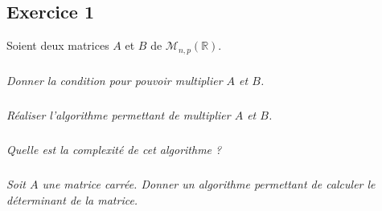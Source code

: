 \documentclass[10pt]{article}
\begin{document}

\subsection*{Exercice 1}

Soient deux matrices $A$ et $B$ de $\mathcal{M}_{n,p}(\mathbb{R})$. 

\subparagraph{}
\textit{Donner la condition pour pouvoir multiplier $A$ et $B$.}

\subparagraph{}
\textit{Réaliser l'algorithme permettant de multiplier $A$ et $B$.}

\subparagraph{}
\textit{Quelle est la complexité de cet algorithme ?}

\subparagraph{}
\textit{Soit $A$ une matrice carrée. Donner un algorithme permettant de calculer le déterminant de la matrice. }
\end{document}
